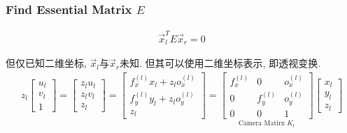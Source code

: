 \subsubsection{Find Essential Matrix $E$}
\begin{align*}
    \vec{x}_l^T E \vec{x}_r=0
\end{align*}

但仅已知二维坐标, $\vec{x}_l$与$\vec{x}_r$未知. 但其可以使用二维坐标表示, 即透视变换. 
\begin{align*}
    z_{l}
    \begin{bmatrix}
        u_{l} \\
        v_{l} \\
        1
    \end{bmatrix}=\begin{bmatrix}
        z_{l} u_{l} \\
        z_{l} v_{l} \\
        z_{l}
    \end{bmatrix}=\begin{bmatrix}
        f_{x}^{(l)} x_{l}+z_{l} o_{x}^{(l)} \\
        f_{y}^{(l)} y_{l}+z_{l} o_{y}^{(l)} \\
        z_{l}
    \end{bmatrix}=
    \underset{\text{Camera Matirx }K_l}{\begin{bmatrix}
        f_{x}^{(l)} & 0 & o_{x}^{(l)} \\
        0 & f_{y}^{(l)} & o_{y}^{(l)} \\
        0 & 0 & 1
    \end{bmatrix}}\begin{bmatrix}
        x_{l} \\
        y_{l} \\
        z_{l}
    \end{bmatrix}
\end{align*}
